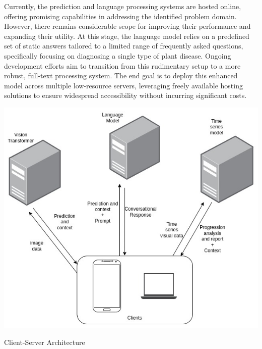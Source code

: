 Currently, the prediction and language processing systems are hosted online, offering promising capabilities in addressing the identified problem domain. However, there remains considerable scope for improving their performance and expanding their utility. At this stage, the language model relies on a predefined set of static answers tailored to a limited range of frequently asked questions, specifically focusing on diagnosing a single type of plant disease. Ongoing development efforts aim to transition from this rudimentary setup to a more robust, full-text processing system. The end goal is to deploy this enhanced model across multiple low-resource servers, leveraging freely available hosting solutions to ensure widespread accessibility without incurring significant costs.

\begin{center}
    \includegraphics[scale=0.5]{images/architecture.jpg}
    
    \caption{Client-Server Architecture}
\end{center}


